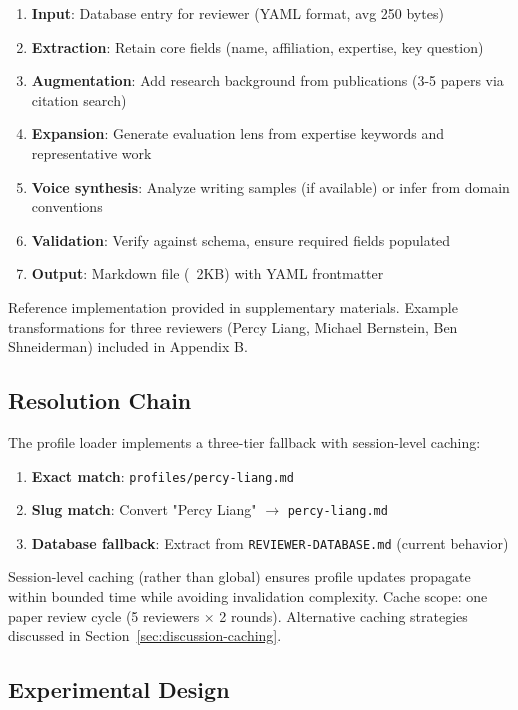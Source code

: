 \begin{enumerate}
\item \textbf{Input}: Database entry for reviewer (YAML format, avg 250 bytes)
\item \textbf{Extraction}: Retain core fields (name, affiliation, expertise, key question)
\item \textbf{Augmentation}: Add research background from publications (3-5 papers via citation search)
\item \textbf{Expansion}: Generate evaluation lens from expertise keywords and representative work
\item \textbf{Voice synthesis}: Analyze writing samples (if available) or infer from domain conventions
\item \textbf{Validation}: Verify against schema, ensure required fields populated
\item \textbf{Output}: Markdown file (~2KB) with YAML frontmatter
\end{enumerate}

Reference implementation provided in supplementary materials. Example transformations for three reviewers (Percy Liang, Michael Bernstein, Ben Shneiderman) included in Appendix B.

\subsection{Resolution Chain}

The profile loader implements a three-tier fallback with session-level caching:

\begin{enumerate}
\item \textbf{Exact match}: \texttt{profiles/percy-liang.md}
\item \textbf{Slug match}: Convert "Percy Liang" $\rightarrow$ \texttt{percy-liang.md}
\item \textbf{Database fallback}: Extract from \texttt{REVIEWER-DATABASE.md} (current behavior)
\end{enumerate}

Session-level caching (rather than global) ensures profile updates propagate within bounded time while avoiding invalidation complexity. Cache scope: one paper review cycle (5 reviewers × 2 rounds). Alternative caching strategies discussed in Section~\ref{sec:discussion-caching}.

\subsection{Experimental Design}

